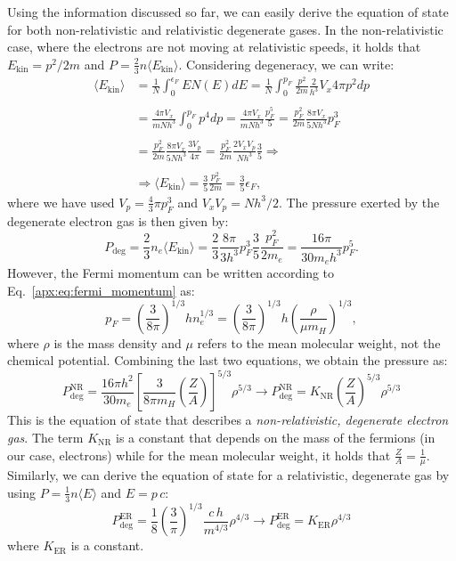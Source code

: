 \documentclass[main.tex]{subfiles}
\begin{document}
Using the information discussed so far, we can easily derive the equation of state for both non-relativistic and relativistic degenerate gases. In the non-relativistic case, where the electrons are not moving at relativistic speeds, it holds that $E_\text{kin} = p^2 / 2m$ and $P = \frac{2}{3}n \langle E_\text{kin} \rangle$. Considering degeneracy, we can write:
\begin{align*}
    \langle E_\text{kin} \rangle &= \frac{1}{N} \int_0^{\epsilon_F} E N(E) dE = \frac{1}{N} \int_0^{p_F} \frac{p^2}{2m} \frac{2}{h^3} V_x 4\pi p^2 dp \\\\
    &= \frac{4\pi V_x}{m N h^3} \int_0^{p_F} p^4 dp = \frac{4\pi V_x}{m N h^3} \frac{p_F^5}{5} = \frac{p_F^2}{2m} \frac{8\pi V_x}{5Nh^3} p_F^3 \\\\
    &= \frac{p_F^2}{2m} \frac{8\pi V_x}{5Nh^3} \frac{3 V_p}{4\pi} = \frac{p_F^2}{2m} \frac{2 V_x V_p}{Nh^3} \frac{3}{5} \Rightarrow \\\\
    &\Rightarrow \langle E_{\text{kin}} \rangle = \frac{3}{5} \frac{p_F^2}{2m} = \frac{3}{5} \epsilon_F,
\end{align*}
where we have used $V_p = \frac{4}{3} \pi p_F^3$ and $V_x V_p = N h^3/2$. 
The pressure exerted by the degenerate electron gas is then given by:
$$P_{\text{deg}} = \frac{2}{3} n_e \langle E_{\text{kin}} \rangle  = \frac{2}{3} \frac{8\pi}{3h^3} p_F^3 \frac{3}{5}\frac{p_F^2}{2m_e} = \frac{16\pi}{30m_e h^3}p_F^5.$$
However, the Fermi momentum can be written according to Eq.~\eqref{apx:eq:fermi_momentum} as:
$$p_F = \left( \frac{3}{8\pi} \right)^{1/3} h n_e^{1/3} = \left(\frac{3}{8\pi} \right)^{1/3} h \left(\frac{\rho}{\mu m_H} \right)^{1/3},$$
where $\rho$ is the mass density and $\mu$ refers to the mean molecular weight, not the chemical potential. Combining the last two equations, we obtain the pressure as:
\begin{equation}
    \label{apx:eq:degenerate_eos_nr}
    \boxed{P_{\text{deg}}^{\text{NR}} = \frac{16 \pi h^2}{30m_e} \left[ \frac{3}{8\pi m_H} \left(\frac{Z}{A} \right) \right]^{5/3} \rho^{5/3} \longrightarrow P_{\text{deg}}^{\text{NR}} = K_{\text{NR}} \left( \frac{Z}{A} \right)^{5/3} \rho^{5/3}}
\end{equation}
This is the equation of state that describes a \textit{non-relativistic, degenerate electron gas}. The term $K_{\text{NR}}$ is a constant that depends on the mass of the fermions (in our case, electrons) while for the mean molecular weight, it holds that $\frac{Z}{A} = \frac{1}{\mu}$.
Similarly, we can derive the equation of state for a relativistic, degenerate gas by using $P = \frac{1}{3}n \langle E \rangle$ and $E = p\,c$:
\begin{equation}
    \label{apx:eq:degenerate_eos_er}
    \boxed{P_{\text{deg}}^{\text{ER}} = \frac{1}{8} \left( \frac{3}{\pi} \right)^{1/3} \frac{c\,h}{m^{4/3}} \rho^{4/3} \longrightarrow P_{\text{deg}}^{\text{ER}} = K_{\text{ER}} \rho^{4/3}}
\end{equation}
where $K_{\text{ER}}$ is a constant.
\end{document}
